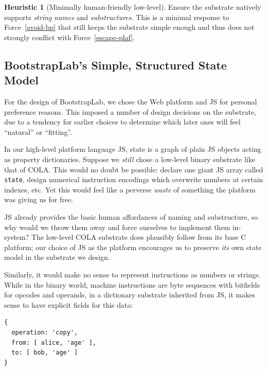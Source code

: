 \documentclass[ twoside,openright,titlepage,numbers=noenddot,headinclude,footinclude,cleardoublepage=empty,abstract=on,
                BCOR=5mm,paper=a4,fontsize=11pt
                ]{scrreprt}
\theoremstyle{definition}
\newtheorem{heuristic}{Heuristic}
\begin{document}
\begin{heuristic}[Minimally human-friendly low-level]
\label{min-friendly-ll}
Ensure the substrate natively supports \emph{string names} and \emph{substructures.} This is a minimal response to Force\ \ref{avoid-bp} that still keeps the substrate simple enough and thus does not strongly conflict with Force\ \ref{escape-plaf}.
\end{heuristic}

\hypertarget{bootstraplabs-simple-structured-state-model}{\subsection{BootstrapLab's Simple, Structured State
Model}\label{bootstraplabs-simple-structured-state-model}}

For the design of BootstrapLab, we chose the Web platform and \ac{JS}
for personal preference reasons. This imposed a number of design
decisions on the substrate, due to a tendency for earlier choices to
determine which later ones will feel ``natural'' or ``fitting''.

In our high-level platform language \ac{JS}, state is a graph of plain
\ac{JS} objects acting as property dictionaries. Suppose we \emph{still}
chose a low-level binary substrate like that of \ac{COLA}. This would no
doubt be possible: declare one giant \ac{JS} array called
\texttt{state}, design numerical instruction encodings which overwrite
numbers at certain indexes, etc. Yet this would feel like a perverse
\emph{waste} of something the platform was giving us for free.

\ac{JS} already provides the basic human affordances of naming and
substructure, so why would we throw them away and force ourselves to
implement them in-system? The low-level \ac{COLA} substrate does
plausibly follow from its base C platform; our choice of \ac{JS} as the
platform encourages us to preserve \emph{its} own state model in the
substrate we design.

Similarly, it would make no sense to represent instructions as numbers
or strings. While in the binary world, machine instructions are byte
sequences with bitfields for opcodes and operands, in a dictionary
substrate inherited from \ac{JS}, it makes sense to have explicit fields
for this data:

\begin{verbatim}
{
  operation: 'copy',
  from: [ alice, 'age' ],
  to: [ bob, 'age' ]
}
\end{verbatim}
\end{document}
